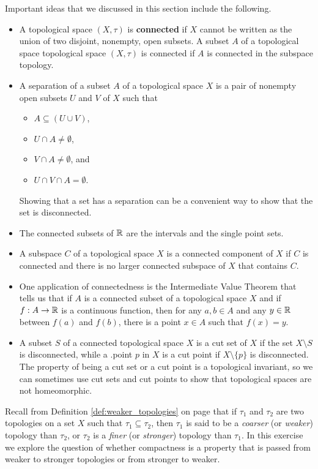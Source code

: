 Important ideas that we discussed in this section include the following.
\begin{itemize}
\item A topological space $(X,\tau)$ is \textbf{connected} if $X$ cannot be written as the union of two disjoint, nonempty, open subsets. A subset $A$ of a topological space topological space $(X,\tau)$ is connected if $A$ is connected in the subspace topology. 
\item A separation of a subset $A$ of a topological space $X$ is a pair of nonempty open subsets $U$ and $V$ of $X$ such that 
\begin{itemize}
\item $A \subseteq (U \cup V)$,
\item $U \cap A \neq \emptyset$, 
\item $V \cap A \neq \emptyset$, and
\item $U \cap V \cap A = \emptyset$.
\end{itemize}
Showing that a set has a separation can be a convenient way to show that the set is disconnected.
\item The connected subsets of $\mathbb{R}$ are the intervals and the single point sets.
\item A subspace $C$ of a topological space $X$ is a connected component of $X$ if $C$ is connected and there is no larger connected subspace of $X$ that contains $C$.
\item One application of connectedness is the Intermediate Value Theorem that tells us that if $A$ is a connected subset of a topological space $X$ and if $f : A \to \mathbb{R}$ is a continuous function, then for any $a,b \in A$ and any $y \in \mathbb{R}$ between $f(a)$ and $f(b)$, there is a point $x \in A$ such that $f(x) = y$. 
\item A subset $S$ of a connected topological space $X$ is a cut set of $X$ if the set $X \setminus S$ is disconnected, while a .point $p$ in $X$ is a cut point if $X \setminus \{p\}$ is disconnected. The property of being a cut set or a cut point is a topological invariant, so we can sometimes use cut sets and cut points to show that topological spaces are not homeomorphic.
\end{itemize}


\be

\item Recall from Definition \ref{def:weaker_topologies} on page \pageref{def:weaker_topologies} that if $\tau_1$ and $\tau_2$ are two topologies on a set $X$ such that $\tau_1 \subseteq \tau_2$, then $\tau_1$ is said to be a \emph{coarser} (or \emph{weaker}) topology than $\tau_2$, or $\tau_2$ is a \emph{finer} (or \emph{stronger}) topology than $\tau_1$. In this exercise we explore the question of whether compactness is a property that is passed from weaker to stronger topologies or from stronger to weaker. 

